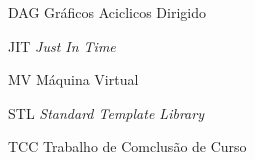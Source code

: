 \begin{siglas}
  \item[DAG]  Gráficos Aciclicos Dirigido
  \item[JIT]  \textit{Just In Time}
  \item[MV]   Máquina Virtual 
  \item[STL]  \textit{Standard Template Library}
  \item[TCC]  Trabalho de Comclusão de Curso
\end{siglas}
